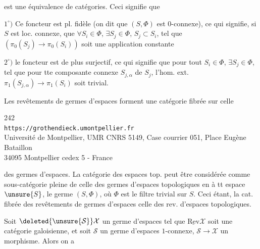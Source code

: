 est une équivalence de catégories. Ceci signifie que

$1^\circ)$ Ce foncteur est pl. fidèle (on dit que $(S,\Phi)$ est $0$-connexe), ce qui signifie, si $S$ est loc. connexe, que $\forall S_i\in\Phi$, $\exists S_j\in\Phi$, $S_j\subset S_i$, tel que  $(\pi_0(S_j)\longrightarrow\pi_0(S_i))$ soit une application constante


$2^\circ)$ le foncteur est de plus  surjectif, ce qui signifie que pour tout $S_i\in\Phi$, $\exists S_j\in\Phi$,  tel que pour tte composante connexe $S_{j,\alpha}$ de $S_j$, l'hom. ext. $\pi_1(S_{j,\alpha})\longrightarrow\pi_1(S_i)$ soit trivial.

Les revêtements de germes d'espaces forment une catégorie fibrée sur celle


\begin{center}
242\\
\texttt{https://grothendieck.umontpellier.fr}\\
Université de Montpellier, UMR CNRS 5149, Case courrier 051, Place Eugène Bataillon\\
34095 Montpellier cedex 5 - France
\end{center}


des germes d'espaces. La catégorie des espaces top.  peut être considérée comme sous-catégorie pleine de celle des germes d'espaces topologiques en  à tt espace $\unsure{S}$, le germe $(S,\Phi)$, où $\Phi$ est le filtre trivial sur $S$. Ceci étant, la cat. fibrée des revêtements de germes d'espaces  celle des rev. d'espaces topologiques.

Soit $\deleted{\unsure{\mathcal S}}\mathcal X$ un germe d'espaces tel que $\underline{\mathrm{Rev}}\mathcal X$ soit une catégorie galoisienne,  et soit $\mathcal S$ un germe d'espaces $1$-connexe, $\mathcal S\longrightarrow\mathcal X$ un morphisme. Alors on a


